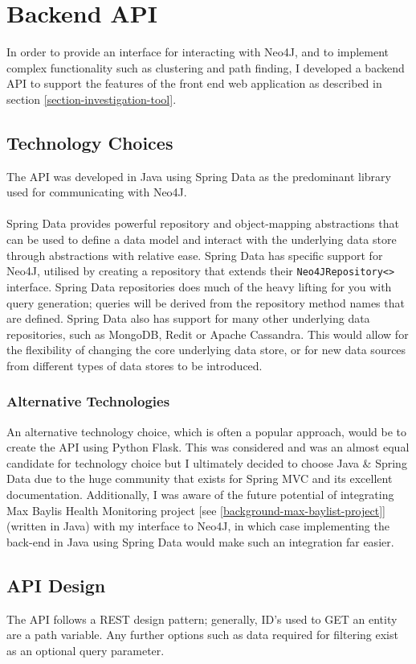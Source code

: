 \section{Backend API}
In order to provide an interface for interacting with Neo4J, and to implement complex functionality such as clustering and path finding, I developed a backend API to support the features of the front end web application as described in section \ref{section-investigation-tool}. 

\subsection{Technology Choices}
The API was developed in Java using Spring Data as the predominant library used for communicating with Neo4J. 
\\\\
Spring Data provides powerful repository and object-mapping abstractions that can be used to define a data model and interact with the underlying data store through abstractions with relative ease. Spring Data has specific support for Neo4J, utilised by creating a repository that extends their \texttt{Neo4JRepository<>} interface. Spring Data repositories does much of the heavy lifting for you with query generation; queries will be derived from the repository method names that are defined. Spring Data also has support for many other underlying data repositories, such as MongoDB, Redit or Apache Cassandra. This would allow for the flexibility of changing the core underlying data store, or for new data sources from different types of data stores to be introduced.

\subsubsection{Alternative Technologies}
An alternative technology choice, which is often a popular approach, would be to create the API using Python Flask. This was considered and was an almost equal candidate for technology choice but I ultimately decided to choose Java \& Spring Data due to the huge community that exists for Spring MVC and its excellent documentation. Additionally, I was aware of the future potential of integrating Max Baylis Health Monitoring project [see \ref{background-max-baylist-project}] (written in Java) with my interface to Neo4J, in which case implementing the back-end in Java using Spring Data would make such an integration far easier. 


\subsection{API Design}
The API follows a REST design pattern; generally, ID's used to GET an entity are a path variable. Any further options such as data required for filtering exist as an optional query parameter.  

